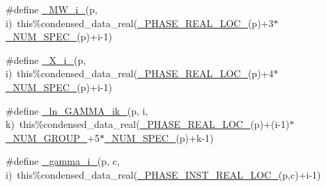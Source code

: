 \begin{DoxyCompactItemize}
\item 
\#define \mbox{\hyperlink{sub__model___u_n_i_f_a_c_8_f90_ab06b1fecd9a89eabf102a8d03185f5b4}{\+\_\+\+M\+W\+\_\+i\+\_\+}}(p,  i)~this\%condensed\+\_\+data\+\_\+real(\mbox{\hyperlink{sub__model___u_n_i_f_a_c_8_f90_a82db0e0fff4e8ab602fb50bebe0b7c38}{\+\_\+\+P\+H\+A\+S\+E\+\_\+\+R\+E\+A\+L\+\_\+\+L\+O\+C\+\_\+}}(p)+3$\ast$\mbox{\hyperlink{sub__model___u_n_i_f_a_c_8_f90_a6a6c2afb1b313ca5d982039833f5da8a}{\+\_\+\+N\+U\+M\+\_\+\+S\+P\+E\+C\+\_\+}}(p)+i-\/1)
\item 
\#define \mbox{\hyperlink{sub__model___u_n_i_f_a_c_8_f90_acc8bb60e8eb22bd6d750c36ee9d958ec}{\+\_\+\+X\+\_\+i\+\_\+}}(p,  i)~this\%condensed\+\_\+data\+\_\+real(\mbox{\hyperlink{sub__model___u_n_i_f_a_c_8_f90_a82db0e0fff4e8ab602fb50bebe0b7c38}{\+\_\+\+P\+H\+A\+S\+E\+\_\+\+R\+E\+A\+L\+\_\+\+L\+O\+C\+\_\+}}(p)+4$\ast$\mbox{\hyperlink{sub__model___u_n_i_f_a_c_8_f90_a6a6c2afb1b313ca5d982039833f5da8a}{\+\_\+\+N\+U\+M\+\_\+\+S\+P\+E\+C\+\_\+}}(p)+i-\/1)
\item 
\#define \mbox{\hyperlink{sub__model___u_n_i_f_a_c_8_f90_ac2efe912048381d499ebfed7c0757bb3}{\+\_\+ln\+\_\+\+G\+A\+M\+M\+A\+\_\+ik\+\_\+}}(p,  i,  k)~this\%condensed\+\_\+data\+\_\+real(\mbox{\hyperlink{sub__model___u_n_i_f_a_c_8_f90_a82db0e0fff4e8ab602fb50bebe0b7c38}{\+\_\+\+P\+H\+A\+S\+E\+\_\+\+R\+E\+A\+L\+\_\+\+L\+O\+C\+\_\+}}(p)+(i-\/1)$\ast$\mbox{\hyperlink{sub__model___u_n_i_f_a_c_8_f90_aaf6ff3fa100a1fa0baec9dba65df6891}{\+\_\+\+N\+U\+M\+\_\+\+G\+R\+O\+U\+P\+\_\+}}+5$\ast$\mbox{\hyperlink{sub__model___u_n_i_f_a_c_8_f90_a6a6c2afb1b313ca5d982039833f5da8a}{\+\_\+\+N\+U\+M\+\_\+\+S\+P\+E\+C\+\_\+}}(p)+k-\/1)
\item 
\#define \mbox{\hyperlink{sub__model___u_n_i_f_a_c_8_f90_a24dd72b4548c6a0a1cd1756ad308b128}{\+\_\+gamma\+\_\+i\+\_\+}}(p,  c,  i)~this\%condensed\+\_\+data\+\_\+real(\mbox{\hyperlink{sub__model___u_n_i_f_a_c_8_f90_ae36fd1141e660c79dd12eac64d119f66}{\+\_\+\+P\+H\+A\+S\+E\+\_\+\+I\+N\+S\+T\+\_\+\+R\+E\+A\+L\+\_\+\+L\+O\+C\+\_\+}}(p,c)+i-\/1)
\end{DoxyCompactItemize}
